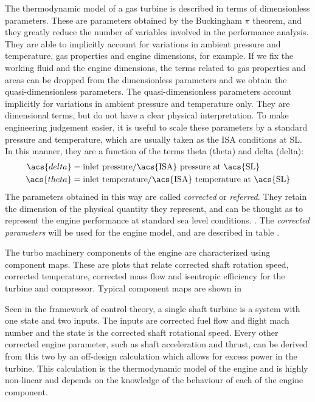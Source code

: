 \documentclass[tcc]{subfiles}
\begin{document}
The thermodynamic model of a gas turbine is described in terms of dimensionless parameters.%
These are parameters obtained by the Buckingham $\pi$ theorem, 
 and they greatly reduce the number of variables involved in the performance analysis.
 They are able to implicitly account for variations in ambient pressure and temperature, 
 gas properties and engine dimensions, for example.
If we fix the working fluid and the engine dimensions, the terms related to gas properties and areas can be dropped from the dimensionless parameters and we obtain the quasi-dimensionless parameters.
The quasi-dimensionless parameters account implicitly for variations in ambient pressure and temperature only.
They are dimensional terms, but do not have a clear physical interpretation. 
To make engineering judgement easier, it is useful to scale these parameters by 
 a standard pressure and temperature, which are usually taken as the 
 \gls{ISA} conditions at \gls{SL}. 
In this manner, they are a function of the terms theta (\acs{theta}) and delta (\acs{delta}):
\begin{align}
    \acs{delta} &= \text{inlet pressure}/\text{\acs{ISA} pressure at \acs{SL}} \\
    \acs{theta} &= \text{inlet temperature}/\text{\acs{ISA} temperature at \acs{SL}}
\end{align}
The parameters obtained in this way are called \emph{corrected} or \emph{referred}.
They retain the dimension of the physical quantity they represent, 
 and can be thought as to represent the engine performance at standard sea level conditions.
\cite{walsh2004gas}. 
The \emph{corrected parameters} will be used for the engine model,
 and are described in table .
 
The turbo machinery components of the engine are characterized using component maps.%
 These are plots that relate corrected shaft rotation speed, corrected temperature,
 corrected mass flow and isentropic efficiency for the turbine and compressor.
Typical component maps are shown in 

Seen in the framework of control theory,
 a single shaft turbine is a system with one state and two inputs.
 The inputs are corrected fuel flow and flight mach number 
 and the state is the corrected shaft rotational speed.
 Every other corrected engine parameter, such as shaft acceleration and thrust,
 can be derived from this two by an off-design calculation
 which allows for excess power in the turbine.
This calculation is the thermodynamic model of the engine and is highly non-linear and depends on the knowledge of the behaviour of each of the engine component.
\end{document}
